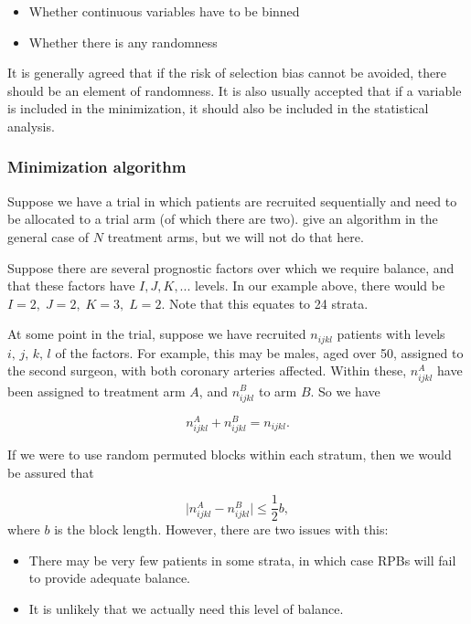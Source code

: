 \documentclass[
  openany]{book}
\providecommand{\tightlist}{%
  \setlength{\itemsep}{0pt}\setlength{\parskip}{0pt}}
\theoremstyle{definition}
\theoremstyle{definition}
\theoremstyle{definition}
\theoremstyle{definition}
\theoremstyle{remark}
\begin{document}
\begin{itemize}
\tightlist
\item
  Whether continuous variables have to be binned
\item
  Whether there is any randomness
\end{itemize}

It is generally agreed that if the risk of selection bias cannot be avoided, there should be an element of randomness. It is also usually accepted that if a variable is included in the minimization, it should also be included in the statistical analysis.

\subsubsection{Minimization algorithm}\label{minimization-algorithm}

Suppose we have a trial in which patients are recruited sequentially and need to be allocated to a trial arm (of which there are two). \citet{pocock1975sequential} give an algorithm in the general case of \(N\) treatment arms, but we will not do that here.

Suppose there are several prognostic factors over which we require balance, and that these factors have \(I, J, K, ...\) levels. In our example above, there would be \(I=2,\; J=2,\; K=3,\; L=2\). Note that this equates to 24 strata.

At some point in the trial, suppose we have recruited \(n_{ijkl}\) patients with levels \(i,\,j,\,k,\,l\) of the factors. For example, this may be males, aged over 50, assigned to the second surgeon, with both coronary arteries affected. Within these, \(n^A_{ijkl}\) have been assigned to treatment arm \(A\), and \(n^B_{ijkl}\) to arm \(B\). So we have

\[ n^A_{ijkl} + n^B_{ijkl} = n_{ijkl} .\]

If we were to use random permuted blocks within each stratum, then we would be assured that

\[\lvert n^A_{ijkl} - n^B_{ijkl} \rvert \leq{\frac{1}{2}b},\]
where \(b\) is the block length. However, there are two issues with this:

\begin{itemize}
\tightlist
\item
  There may be very few patients in some strata, in which case RPBs will fail to provide adequate balance.
\item
  It is unlikely that we actually need this level of balance.
\end{itemize}
\end{document}
